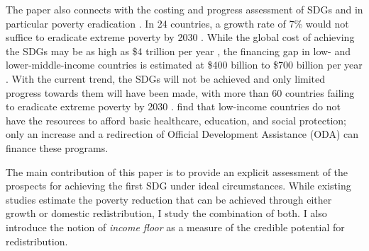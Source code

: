 The paper also connects with the costing and progress assessment of SDGs and in particular poverty eradication \citep{schmidt-traub_investment_2015,rozenberg_beyond_2019,sdsn_sdg_2019,manuel_financing_2020,vorisek_understanding_2020,unctad_estimating_2021,un_sustainable_2022}. In 24 countries, a growth rate of 7\% would not suffice to eradicate extreme poverty by 2030 \citep{unctad_estimating_2021}. While the global cost of achieving the SDGs may be as high as \$4 trillion per year \citep{unctad_world_2023}, %
the financing gap in low- and lower-middle-income countries is estimated at \$400 billion \citep{sdsn_sdg_2019} %
to \$700 billion per year \citep{kharas_building_2019}. %
With the current trend, the SDGs will not be achieved and only limited progress towards them will have been made, with more than 60 countries failing to eradicate extreme poverty by 2030 \citep{moyer_are_2020}. %
\cite{manuel_financing_2018} find that low-income countries do not have the resources to afford basic healthcare, education, and social protection; only an increase and a redirection of Official Development Assistance (ODA) can finance these programs. 

The main contribution of this paper is to provide an explicit assessment of the prospects for achieving the first SDG under ideal circumstances. While existing studies estimate the poverty reduction that can be achieved through either growth or domestic redistribution, I study the combination of both. I also introduce the notion of \textit{income floor} as a measure of the credible potential for redistribution. %

